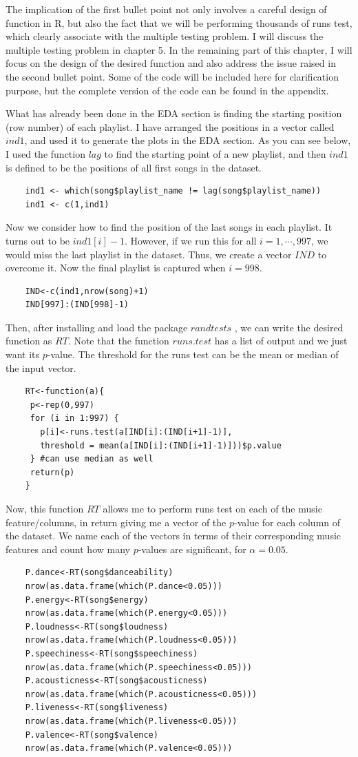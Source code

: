 \documentclass[12pt]{article}
\theoremstyle{plain}
\theoremstyle{definition}
\theoremstyle{remark}
\begin{document}
The implication of the first bullet point not only involves a careful design of function in R, but also the fact that we will be performing thousands of runs test, which clearly associate with the multiple testing problem. I will discuss the multiple testing problem in chapter 5. In the remaining part of this chapter, I will focus on the design of the desired function and also address the issue raised in the second bullet point. Some of the code will be included here for clarification purpose, but the complete version of the code can be found in the appendix.

What has already been done in the EDA section is finding the starting position (row number) of each playlist. I have arranged the positions in a vector called $ind1$, and used it to generate the plots in the EDA section. As you can see below, I used the function $lag$ to find the starting point of a new playlist, and then $ind1$ is defined to be the positions of all first songs in the dataset.
\begin{verbatim}
    ind1 <- which(song$playlist_name != lag(song$playlist_name))
    ind1 <- c(1,ind1)
\end{verbatim}
Now we consider how to find the position of the last songs in each playlist. It turns out to be $ind1[i]-1$. However, if we run this for all $i=1, \cdots, 997$, we would miss the last playlist in the dataset. Thus, we create a vector $IND$ to overcome it. Now the final playlist is captured when $i=998$. 
\begin{verbatim}
    IND<-c(ind1,nrow(song)+1)
    IND[997]:(IND[998]-1)
\end{verbatim}
Then, after installing and load the package $randtests$ \cite{3.7}, we can write the desired function as $RT$. Note that the function $runs.test$ has a list of output and we just want its $p$-value. The threshold for the runs test can be the mean or median of the input vector.
\begin{verbatim}
    RT<-function(a){
     p<-rep(0,997)
     for (i in 1:997) {
       p[i]<-runs.test(a[IND[i]:(IND[i+1]-1)],
       threshold = mean(a[IND[i]:(IND[i+1]-1)]))$p.value
     } #can use median as well
     return(p)
    }
\end{verbatim}

Now, this function $RT$ allows me to perform runs test on each of the music feature/columns, in return giving me a vector of the $p$-value for each column of the dataset. We name each of the vectors in terms of their corresponding music features and count how many $p$-values are significant, for $\alpha=0.05$.
\begin{verbatim}
    P.dance<-RT(song$danceability)
    nrow(as.data.frame(which(P.dance<0.05)))
    P.energy<-RT(song$energy)
    nrow(as.data.frame(which(P.energy<0.05)))
    P.loudness<-RT(song$loudness)
    nrow(as.data.frame(which(P.loudness<0.05)))
    P.speechiness<-RT(song$speechiness)
    nrow(as.data.frame(which(P.speechiness<0.05)))
    P.acousticness<-RT(song$acousticness)
    nrow(as.data.frame(which(P.acousticness<0.05)))
    P.liveness<-RT(song$liveness)
    nrow(as.data.frame(which(P.liveness<0.05)))
    P.valence<-RT(song$valence)
    nrow(as.data.frame(which(P.valence<0.05)))
\end{verbatim}
\end{document}
